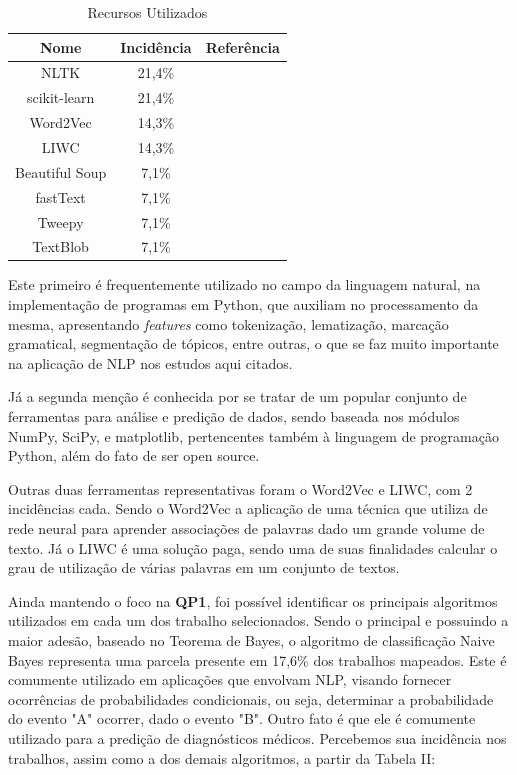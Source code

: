\documentclass[conference]{IEEEtran}
\begin{document}
\begin{table}[h]
    \centering
    \caption{Recursos Utilizados}
    \begin{tabular}[t]{c|c|c}
         \hline
         \textbf{Nome} & \textbf{Incidência} & \textbf{Referência}\\
         \hline
         NLTK & 21,4\% & \cite{ArtigoN2, ArtigoN4, ArtigoN9} \\
         scikit-learn & 21,4\% & \cite{ArtigoN5, ArtigoN7, ArtigoN8} \\
         Word2Vec & 14,3\% & \cite{ArtigoN3, ArtigoN5} \\
         LIWC & 14,3\% & \cite{ArtigoN11, ArtigoN12} \\
         Beautiful Soup & 7,1\% & \cite{ArtigoN4} \\
         fastText & 7,1\% & \cite{ArtigoN6} \\
         Tweepy & 7,1\% & \cite{ArtigoN8} \\
         TextBlob & 7,1\% & \cite{ArtigoN9}
    \end{tabular}
    \label{tab:recursos_utilizados}
\end{table}

Este primeiro é frequentemente utilizado no campo da linguagem natural, na implementação de programas em Python, que auxiliam no processamento da mesma, apresentando \textit{features} como tokenização, lematização, marcação gramatical, segmentação de tópicos, entre outras, o que se faz muito importante na aplicação de NLP nos estudos aqui citados.

Já a segunda menção é conhecida por se tratar de um popular conjunto de ferramentas para análise e predição de dados, sendo baseada nos módulos NumPy, SciPy, e matplotlib, pertencentes também à linguagem de programação Python, além do fato de ser open source.

Outras duas ferramentas representativas foram o Word2Vec e LIWC, com 2 incidências cada. Sendo o Word2Vec a aplicação de uma técnica que utiliza de rede neural para aprender associações de palavras dado um grande volume de texto. Já o LIWC é uma solução paga, sendo uma de suas finalidades calcular o grau de utilização de várias palavras em um conjunto de textos.

Ainda mantendo o foco na \textbf{QP1}, foi possível identificar os principais algoritmos utilizados em cada um dos trabalho selecionados. Sendo o principal e possuindo a maior adesão, baseado no Teorema de Bayes, o algoritmo de classificação Naive Bayes representa uma parcela presente em 17,6\% dos trabalhos mapeados. Este é comumente utilizado em aplicações que envolvam NLP, visando fornecer ocorrências de probabilidades condicionais, ou seja, determinar a probabilidade do evento "A" ocorrer, dado o evento "B". Outro fato é que ele é comumente utilizado para a predição de diagnósticos médicos. Percebemos sua incidência nos trabalhos, assim como a dos demais algoritmos, a partir da Tabela II:
\end{document}
